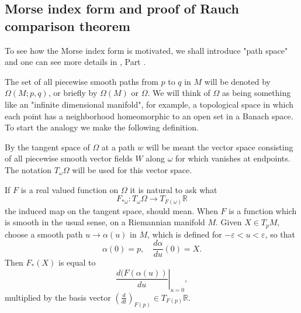 \documentclass{ctexart}
\begin{document}

\subsection*{Morse index form and proof of Rauch comparison theorem}

To see how the Morse index form is motivated, we shall introduce "path space" and one can see more details in \cite{Milnor1973}, Part \uppercase\expandafter{}. 

The set of all piecewise smooth paths from $p$ to $q$ in $M$ will be denoted by $\Omega(M ; p, q)$, or briefly by $\Omega(M)$ or $\Omega$.
We will think of $\Omega$ as being something like an "infinite dimensional manifold", for example, a topological space in which each point has a neighborhood 
homeomorphic to an open set in a Banach space. To start the analogy we make the following definition.

By the tangent space of $\Omega$ at a path $w$ will be meant the vector space consisting of all piecewise smooth vector fields $W$ along $\omega$ for which vanishes 
at endpoints. The notation $T_\omega \Omega$ will be used for this vector space.

If $F$ is a real valued function on $\Omega$ it is natural to ask what
$$
F_{*\omega}: T_\omega \Omega \rightarrow T_{F(\omega)} \mathbb{R}
$$
the induced map on the tangent space, should mean. When $F$ is a function which is smooth in the usual sense, on a Riemannian manifold $M$. 
Given $X \in T_p M$, choose a smooth path $u \rightarrow \alpha(u)$ in $M$, which is defined for $-\varepsilon<u<\varepsilon$, so that
$$
\alpha(0)=p, \quad \frac{d \alpha}{d u}(0)=X. 
$$
Then $F_*(X)$ is equal to 
$$
\left.\frac{d(F(\alpha(u))}{d u}\right|_{u=0},
$$
multiplied by the basis vector $\left(\frac{d}{d t}\right)_{F(p)} \in T_{F(p)}\mathbb{R}$. 
\end{document}
